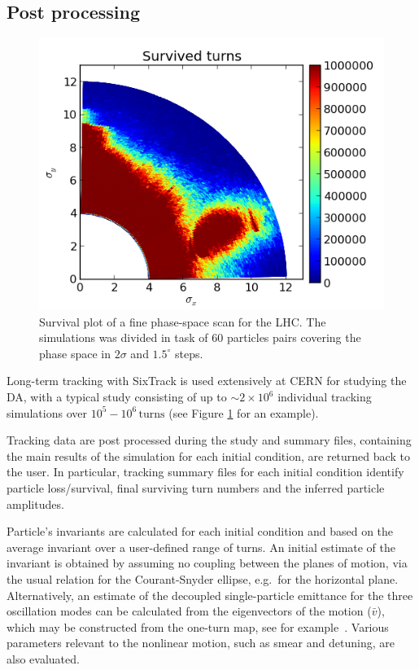 \documentclass[a4paper,
              ]{jacow}
\begin{document}
\subsection{Post processing}
\begin{figure}[tbh]
\centering
 \includegraphics[width=\columnwidth]{surv_plot1.png}
 \caption{Survival plot of a fine phase-space scan for the LHC. The simulations was divided in task of $60$ particles pairs covering the phase space in $2\sigma$ and $1.5^\circ$ steps.}
 \label{fig:study}
\end{figure}

Long-term tracking with SixTrack is used extensively at CERN for studying the DA, with a typical study consisting of up to $\sim 2\times 10^{6}$ individual tracking simulations over $10^5-10^6\,\mathrm{turns}$ (see Figure \ref{fig:study} for an example).

Tracking data are post processed during the study and summary files, containing the main results of the simulation for each initial condition, are returned back to the user. In particular, tracking summary files for each initial condition identify particle loss/survival, final surviving turn numbers and the inferred particle amplitudes.

Particle's invariants are calculated for each initial condition and based on the average invariant over a user-defined range of turns.
An initial estimate of the invariant is obtained by assuming no coupling between the planes of motion, via the usual relation for the Courant-Snyder ellipse, e.g.\ for the horizontal plane.
Alternatively, an estimate of the decoupled single-particle emittance for the three oscillation modes can be calculated from the eigenvectors of the motion ($\bar{v}$), which may be constructed from the one-turn map, see for example~\cite{maisripken}. Various parameters relevant to the nonlinear motion, such as smear and detuning, are also evaluated.
\end{document}
